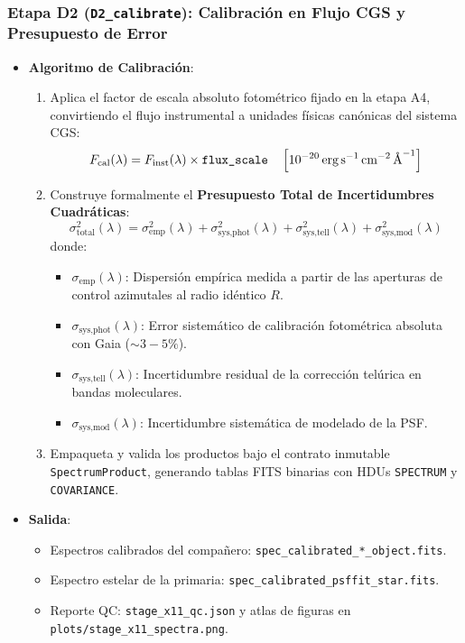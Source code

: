 \documentclass[11pt,a4paper]{article}
\begin{document}
\subsubsection{Etapa D2 (\texttt{D2\_calibrate}): Calibración en Flujo CGS y Presupuesto de Error}
\begin{itemize}[leftmargin=1.0cm]
    \item \textbf{Algoritmo de Calibración}:
    \begin{enumerate}
        \item Aplica el factor de escala absoluto fotométrico fijado en la etapa A4, convirtiendo el flujo instrumental a unidades físicas canónicas del sistema CGS:
        $$F_\text{cal}(\lambda) = F_\text{inst}(\lambda) \times \text{\texttt{flux\_scale}} \quad \left[10^{-20}\,\text{erg}\,\text{s}^{-1}\,\text{cm}^{-2}\,\text{\AA}^{-1}\right]$$
        \item Construye formalmente el \textbf{Presupuesto Total de Incertidumbres Cuadráticas}:
        $$\sigma_\text{total}^2(\lambda) = \sigma_\text{emp}^2(\lambda) + \sigma_\text{sys,phot}^2(\lambda) + \sigma_\text{sys,tell}^2(\lambda) + \sigma_\text{sys,mod}^2(\lambda)$$
        donde:
        \begin{itemize}
            \item $\sigma_\text{emp}(\lambda)$: Dispersión empírica medida a partir de las aperturas de control azimutales al radio idéntico $R$.
            \item $\sigma_\text{sys,phot}(\lambda)$: Error sistemático de calibración fotométrica absoluta con Gaia ($\sim 3-5\%$).
            \item $\sigma_\text{sys,tell}(\lambda)$: Incertidumbre residual de la corrección telúrica en bandas moleculares.
            \item $\sigma_\text{sys,mod}(\lambda)$: Incertidumbre sistemática de modelado de la PSF.
        \end{itemize}
        \item Empaqueta y valida los productos bajo el contrato inmutable \texttt{SpectrumProduct}, generando tablas FITS binarias con HDUs \texttt{SPECTRUM} y \texttt{COVARIANCE}.
    \end{enumerate}
    \item \textbf{Salida}:
    \begin{itemize}
        \item Espectros calibrados del compañero: \texttt{spec\_calibrated\_*\_object.fits}.
        \item Espectro estelar de la primaria: \texttt{spec\_calibrated\_psffit\_star.fits}.
        \item Reporte QC: \texttt{stage\_x11\_qc.json} y atlas de figuras en \texttt{plots/stage\_x11\_spectra.png}.
    \end{itemize}
\end{itemize}
\end{document}
